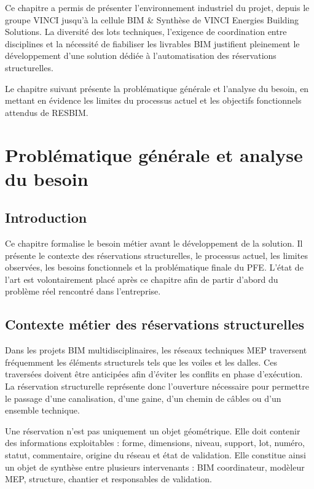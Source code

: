 \documentclass[12pt,a4paper]{report}
\begin{document}
Ce chapitre a permis de présenter l'environnement industriel du projet, depuis le groupe VINCI jusqu'à la cellule BIM \& Synthèse de VINCI Energies Building Solutions. La diversité des lots techniques, l'exigence de coordination entre disciplines et la nécessité de fiabiliser les livrables BIM justifient pleinement le développement d'une solution dédiée à l'automatisation des réservations structurelles.

Le chapitre suivant présente la problématique générale et l'analyse du besoin, en mettant en évidence les limites du processus actuel et les objectifs fonctionnels attendus de RESBIM.
\chapter{Problématique générale et analyse du besoin}

\section{Introduction}
Ce chapitre formalise le besoin métier avant le développement de la solution. Il présente le contexte des réservations structurelles, le processus actuel, les limites observées, les besoins fonctionnels et la problématique finale du PFE. L'état de l'art est volontairement placé après ce chapitre afin de partir d'abord du problème réel rencontré dans l'entreprise.

\section{Contexte métier des réservations structurelles}
Dans les projets BIM multidisciplinaires, les réseaux techniques MEP traversent fréquemment les éléments structurels tels que les voiles et les dalles. Ces traversées doivent être anticipées afin d'éviter les conflits en phase d'exécution. La réservation structurelle représente donc l'ouverture nécessaire pour permettre le passage d'une canalisation, d'une gaine, d'un chemin de câbles ou d'un ensemble technique.

Une réservation n'est pas uniquement un objet géométrique. Elle doit contenir des informations exploitables : forme, dimensions, niveau, support, lot, numéro, statut, commentaire, origine du réseau et état de validation. Elle constitue ainsi un objet de synthèse entre plusieurs intervenants : BIM coordinateur, modèleur MEP, structure, chantier et responsables de validation.
\end{document}

